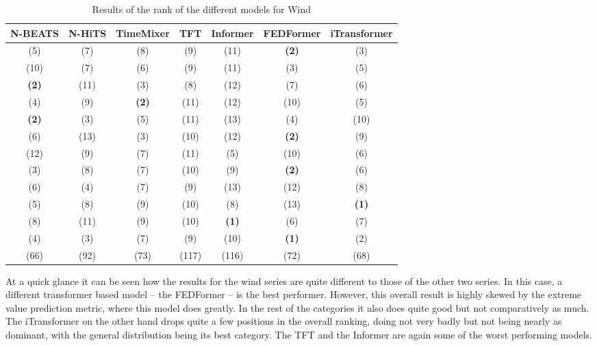 \begin{table}[ht]
    \footnotesize
    \begin{flushright}
    \begin{tabular}[r]{|ccc|cccc}
        \toprule
        N-BEATS&N-HiTS&TimeMixer&TFT&Informer&FEDFormer&iTransformer \\
        \midrule            
        (5)&(7)&(8)&(9)&(11)&\textbf{(2)}&(3) \\
        (10)&(7)&(6)&(9)&(11)&(3)&(5) \\
        \textbf{(2)}&(11)&(3)&(8)&(12)&(7)&(6) \\
        \midrule
        (4)&(9)&\textbf{(2)}&(11)&(12)&(10)&(5) \\
        \textbf{(2)}&(3)&(5)&(11)&(13)&(4)&(10) \\
        (6)&(13)&(3)&(10)&(12)&\textbf{(2)}&(9) \\
        \midrule
        (12)&(9)&(7)&(11)&(5)&(10)&(6) \\
        (3)&(8)&(7)&(10)&(9)&\textbf{(2)}&(6) \\
        (6)&(4)&(7)&(9)&(13)&(12)&(8) \\
        (5)&(8)&(9)&(10)&(8)&(13)&\textbf{(1)} \\
        (8)&(11)&(9)&(10)&\textbf{(1)}&(6)&(7) \\
        (4)&(3)&(7)&(9)&(10)&\textbf{(1)}&(2) \\
        \bottomrule
        (66)&(92)&(73)&(117)&(116)&(72)&(68) \\
        \bottomrule
    \end{tabular}
    \end{flushright}
    \caption{Results of the rank of the different models for Wind\label{long}}
    \label{table:results-rank-wind}
\end{table}

At a quick glance it can be seen how the results for the wind series are quite different to those of the other two series. In this case, a different transformer based model -- the FEDFormer -- is the best performer. However, this overall result is highly skewed by the extreme value prediction metric, where this model does greatly. In the rest of the categories it also does quite good but not comparatively as much. The iTransformer on the other hand drops quite a few positions in the overall ranking, doing not very badly but not being nearly as dominant, with the general distribution being its best category. The TFT and the Informer are again some of the worst performing models. 

